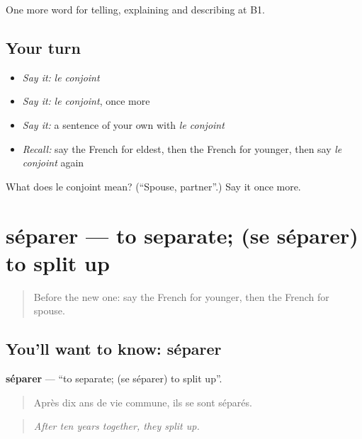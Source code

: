 \begin{grammarlens}[title={What you've built}]
One more word for telling, explaining and describing at B1.
\end{grammarlens}

\subsection*{Your turn}
\begin{itemize}
\raggedright
  \item \emph{Say it:} \emph{le conjoint}
  \item \emph{Say it:} \emph{le conjoint}, once more
  \item \emph{Say it:} a sentence of your own with \emph{le conjoint}
  \item \emph{Recall:} say the French for eldest, then the French for younger, then say \emph{le conjoint} again
\end{itemize}

\begin{tcolorbox}[breakable,colback=teal!4,colframe=teal!35!black,title={Before you move on}]
What does le conjoint mean? (\textquotedblleft{}Spouse, partner\textquotedblright{}.) Say it once more.
\end{tcolorbox}
\section[séparer]{séparer — to separate; (se séparer) to split up}

\label{lesson:FR-C491-separer}



\begin{quote}
Before the new one: say the French for younger, then the French for spouse.
\end{quote}

\subsection*{You'll want to know: séparer}
\textbf{séparer} — \textquotedblleft{}to separate; (se séparer) to split up\textquotedblright{}.

\begin{quote}
Après dix ans de vie commune, ils se sont séparés.
\end{quote}

\begin{quote}
\emph{After ten years together, they split up.}
\end{quote}

